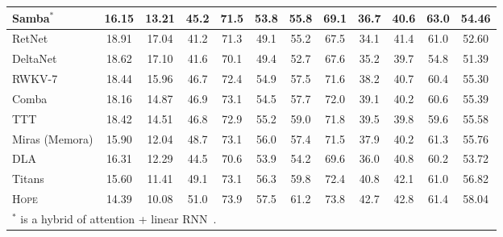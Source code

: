 \documentclass{article}
\newcommand{\citep}{\parencite}
\newcommand{\model}[0]{\textsc{Hope}}
\begin{document}
{\begin{table}[t!]
{\begin{tabular}{l|c c|c c c c c c c c c}
 Samba$^*$ & 16.15 & 13.21 & 45.2 & 71.5 & 53.8 &	55.8 & 69.1	& 36.7 &  40.6  &  {63.0}  & 54.46 \\
 \midrule
 RetNet & 18.91 & 17.04 & 41.2 & 71.3 & 49.1 &	55.2 & 67.5	& 34.1 &  {41.4}  & {61.0}  & 52.60 \\
 DeltaNet & 18.62 & 17.10 & 41.6 & 70.1 & 49.4 &	52.7 & 67.6	& 35.2 &  39.7  & 54.8  & 51.39 \\
 RWKV-7 & 18.44 & 15.96 & 46.7 & 72.4 & 54.9 & 57.5 & 71.6 & 38.2 & 40.7 & 60.4 & 55.30\\
 Comba & 18.16 & 14.87 & 46.9 & 73.1 & 54.5 & 57.7 & 72.0 & 39.1 & 40.2 & 60.6 & 55.39 \\
\midrule
TTT & 18.42 & 14.51 &  46.8 & 72.9  & 55.2 &  59.0 & 71.8 & 39.5 &  39.8 & 59.6 & 55.58 \\
 Miras (Memora) &  15.90 & 12.04  &  48.7   &  73.1 &  56.0 &  57.4 & 71.5  & 37.9 & 40.2 & 61.3 &  55.76\\
DLA & 16.31 & 12.29 & 44.5   & 70.6 & 53.9 & 54.2 & 69.6 & 36.0 & 40.8  & 60.2 & 53.72\\
Titans & 15.60 & 11.41 &  49.1 & 73.1  & 56.3 &  59.8 & 72.4 & 40.8 &  42.1 & 61.0 & 56.82\\
\midrule
\rowcolor{mygray} \model & 14.39 & 10.08 &  51.0 & 73.9 & 57.5 & 61.2 & 73.8 & 42.7 & 42.8 & 61.4 & 58.04 \\
\bottomrule
\multicolumn{5}{l}{$^*$ is a hybrid of attention + linear RNN~\citep{ren2024samba}.}
\end{tabular}
}
\end{table}

}
\end{document}
